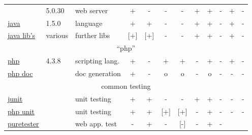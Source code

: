 \begin{tabular}[t]{|lll|cc|ccccccc|}
    &
    5.0.30 %
    & 
    web server %
    & 
    +  %
    & 
    -  %
    &
    - %
    &
    - %
    &
    + %
    &
    + %
    & 
    - %
    &
    + %
    &
    - %
    \\
    \href{http://java.sun.com/j2se/index.jsp}{java}
    &
    1.5.0 %
    & 
    language %
    & 
    +  %
    & 
    +  %
    &
    - %
    &
    - %
    &
    + %
    &
    + %
    & 
    - %
    &
    + %
    &
    - %
    \\
    \href{http://www.informatik.uni-kiel.de/~java}{java lib's}
    &
    various %
    & 
    further libs %
    & 
    [+] %
    & 
    [+]  %
    &
    - %
    &
    - %
    &
    + %
    &
    + %
    & 
    - %
    &
    + %
    &
    - %
    \\\hline
    \multicolumn{12}{|c|}{``php''}
    \\\hline
    \href{https://www.php.net}{php}
    &
    4.3.8 %
    & 
    scripting lang. %
    & 
    +  %
    & 
    -  %
    &
    + %
    &
    + %
    &
    - %
    &
    + %
    & 
    - %
    &
    + %
    &
    - %
    \\
    \href{http://www.phpdoc.org}{php doc}
    &
    & 
    doc generation
    & 
    +  %
    & 
    -  %
    &
    o %
    &
    o %
    &
    - %
    &
    o %
    & 
    - %
    &
    - %
    &
    - %
    \\\hline
    \multicolumn{12}{|c|}{common testing}
    \\\hline
    \href{http://www.junit.org}{junit}
    &
    &
    unit testing
    & 
    +  %
    & 
    +  %
    &
    - %
    &
    - %
    &
    + %
    &
    + %
    & 
    - %
    &
    - %
    &
    - %
    \\
    \href{http://www.sebastian-bergmann.de/en/phpunit.php}{php unit} 
    &
    &
    unit testing
    & 
    +  %
    & 
    +  %
    &
    [+] %
    &
    [+] %
    &
    - %
    &
    + %
    & 
    - %
    &
    - %
    &
    - %
    \\
    \href{}{puretester} 
    &
    &
    web app. test
    & 
    -  %
    & 
    +  %
    &
    - %
    &
    [-] %
    &
    - %
    &
    + %
    & 
    - %

\end{tabular}

